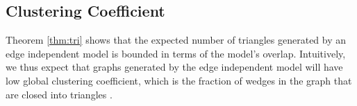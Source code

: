 \documentclass{article}
\newtheorem{theorem}{Theorem}
\newcommand{\norm}[1]{\|#1\|}
\newcommand{\E}{\mathbb{E}}
\DeclareMathOperator{\tr}{tr}
\begin{document}

  
%  
    
\subsection{Clustering Coefficient}
Theorem \ref{thm:tri} shows that the expected number of triangles generated by an edge independent model is bounded in terms of the model's overlap. Intuitively, we thus expect that graphs generated by the edge independent model will have low global clustering coefficient, which is the fraction of wedges in the graph that are closed into triangles \cite{WattsStrogatz:1998}.
\end{document}
